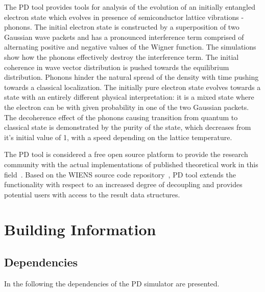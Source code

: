 The PD tool provides tools for analysis of the evolution of an initially entangled
electron state which evolves in presence of semiconductor lattice vibrations - phonons.
The initial electron state is constructed by a superposition of two Gaussian wave packets
and has a pronounced interference term comprised of alternating positive and negative
values of the Wigner function. The simulations show how the phonons effectively
destroy the interference term. The initial coherence in wave vector distribution
is pushed towards the equilibrium distribution. Phonons hinder
the natural spread of the density with time pushing towards a classical
localization. The initially pure electron state evolves towards a state with an
entirely different physical interpretation: it is a mixed state where the
electron can be with given probability in one of the two Gaussian packets.
The decoherence effect of the phonons causing transition
from quantum to classical state is demonstrated by the purity of the
state, which decreases from it’s initial value of 1, with a speed depending
on the lattice temperature.

The PD tool is considered a free open source platform to provide the research community
with the actual implementations of published theoretical work in this field~\cite{Schwaha_borovets_2011}.
Based on the WIENS source code repository~\cite{wiensonline}, PD tool extends the functionality
with respect to an increased degree of decoupling and provides potential users with access to the result data structures.





\section{Building Information} %

\subsection{Dependencies}

In the following the dependencies of the PD simulator are presented.

